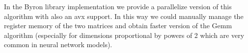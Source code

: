 \documentclass{standalone}
\begin{document}
In the Byron library implementation we provide a parallelize version of this algorithm with also an \textsf{avx} support.
In this way we could manually manage the register memory of the two matrices and obtain faster version of the Gemm algorithm (especially for dimensions proportional by powers of 2 which are very common in neural network models).
\end{document}
